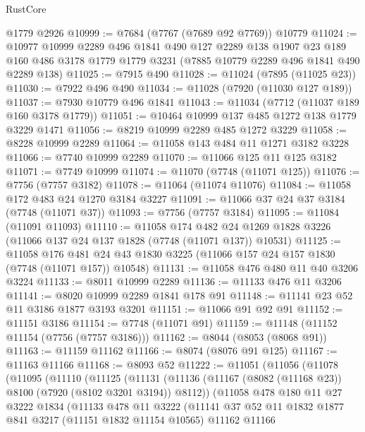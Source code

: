 \begin{lexlean}{RustCore}
\begin{coremodule}
    @1779
    @2926
@10999 := @7684 (@7767 (@7689 @92 @7769)) @10779
@11024 := @10977
    @10999
    @2289
    @496
    @1841
    @490
    @127
    @2289
    @138
    @1907
    @23
    @189
    @160
    @486
    @3178
    @1779
    @1779
    @3231
    (@7885 @10779 @2289 @496 @1841 @490 @2289 @138)
@11025 := @7915 @490
@11028 := @11024 (@7895 (@11025 @23))
@11030 := @7922 @496 @490
@11034 := @11028 (@7920 (@11030 @127 @189))
@11037 := @7930 @10779 @496 @1841
@11043 := @11034 (@7712 (@11037 @189 @160 @3178 @1779))
@11051 := @10464 @10999 @137 @485 @1272 @138 @1779 @3229 @1471
@11056 := @8219 @10999 @2289 @485 @1272 @3229
@11058 := @8228 @10999 @2289
@11064 := @11058 @143 @484 @11 @1271 @3182 @3228
@11066 := @7740 @10999 @2289
@11070 := @11066 @125 @11 @125 @3182
@11071 := @7749 @10999
@11074 := @11070 (@7748 (@11071 @125))
@11076 := @7756 (@7757 @3182)
@11078 := @11064 (@11074 @11076)
@11084 := @11058 @172 @483 @24 @1270 @3184 @3227
@11091 := @11066 @37 @24 @37 @3184 (@7748 (@11071 @37))
@11093 := @7756 (@7757 @3184)
@11095 := @11084 (@11091 @11093)
@11110 := @11058
    @174
    @482
    @24
    @1269
    @1828
    @3226
    (@11066 @137 @24 @137 @1828 (@7748 (@11071 @137)) @10531)
@11125 := @11058
    @176
    @481
    @24
    @43
    @1830
    @3225
    (@11066 @157 @24 @157 @1830 (@7748 (@11071 @157)) @10548)
@11131 := @11058 @476 @480 @11 @40 @3206 @3224
@11133 := @8011 @10999 @2289
@11136 := @11133 @476 @11 @3206
@11141 := @8020 @10999 @2289 @1841 @178 @91
@11148 := @11141 @23 @52 @11 @3186 @1877 @3193 @3201
@11151 := @11066 @91 @92 @91
@11152 := @11151 @3186
@11154 := @7748 (@11071 @91)
@11159 := @11148 (@11152 @11154 (@7756 (@7757 @3186)))
@11162 := @8044 (@8053 (@8068 @91))
@11163 := @11159 @11162
@11166 := @8074 (@8076 @91 @125)
@11167 := @11163 @11166
@11168 := @8093 @52
@11222 := @11051
    (@11056
      (@11078
        (@11095
          (@11110
            (@11125
              (@11131
                (@11136 (@11167 (@8082 (@11168 @23)) @8100 (@7920 (@8102 @3201 @3194)) @8112))
                (@11058
                  @478
                  @180
                  @11
                  @27
                  @3222
                  @1834
                  (@11133
                    @478
                    @11
                    @3222
                    (@11141
                      @37
                      @52
                      @11
                      @1832
                      @1877
                      @841
                      @3217
                      (@11151 @1832 @11154 @10565)
                      @11162
                      @11166

\end{coremodule}
\end{lexlean}
